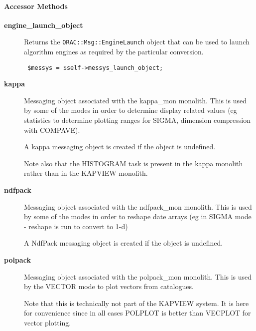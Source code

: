 \paragraph*{Accessor Methods\label{ORAC::Display::KAPVIEW_Accessor_Methods}}
\begin{description}

\item[{\textbf{engine\_launch\_object}}] \mbox{}

Returns the \texttt{ORAC::Msg::EngineLaunch} object that can be used
to launch algorithm engines as required by the particular
conversion.

\begin{verbatim}
 $messys = $self->messys_launch_object;
\end{verbatim}

\item[{\textbf{kappa}}] \mbox{}

Messaging object associated with the kappa\_mon monolith.
This is used by some of the modes in order to determine
display related values (eg statistics to determine plotting
ranges for SIGMA, dimension compression with COMPAVE).



A kappa messaging object is created if the object is undefined.



Note also that the HISTOGRAM task is present in the kappa monolith
rather than in the KAPVIEW monolith.


\item[{\textbf{ndfpack}}] \mbox{}

Messaging object associated with the ndfpack\_mon monolith.
This is used by some of the modes in order to reshape
date arrays (eg in SIGMA mode - reshape is run to convert
to 1-d)



A NdfPack messaging object is created if the object is undefined.


\item[{\textbf{polpack}}] \mbox{}

Messaging object associated with the polpack\_mon monolith.
This is used by the VECTOR mode to plot vectors from catalogues.



Note that this is technically not part of the KAPVIEW system.
It is here for convenience since in all cases POLPLOT is better
than VECPLOT for vector plotting.




\end{description}

